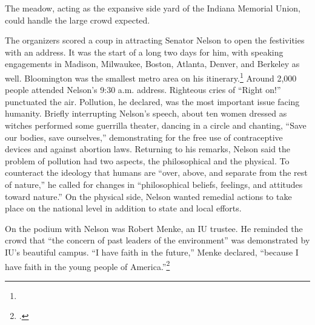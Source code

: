 \documentclass[
  american,
  letterpaper,
]{scrreprt}
\begin{document}
The meadow, acting as the expansive side yard of the Indiana Memorial
Union, could handle the large crowd expected.

The organizers scored a coup in attracting Senator Nelson to open the
festivities with an address. It was the start of a long two days for
him, with speaking engagements in Madison, Milwaukee, Boston, Atlanta,
Denver, and Berkeley as well. Bloomington was the smallest metro area on
his itinerary.\footnote{} Around 2,000 people attended Nelson's 9:30 a.m.
address. Righteous cries of ``Right on!'' punctuated the air. Pollution,
he declared, was the most important issue facing humanity. Briefly
interrupting Nelson's speech, about ten women dressed as witches
performed some guerrilla theater, dancing in a circle and chanting,
``Save our bodies, save ourselves,'' demonstrating for the free use of
contraceptive devices and against abortion laws. Returning to his
remarks, Nelson said the problem of pollution had two aspects, the
philosophical and the physical. To counteract the ideology that humans
are ``over, above, and separate from the rest of nature,'' he called for
changes in ``philosophical beliefs, feelings, and attitudes toward
nature.'' On the physical side, Nelson wanted remedial actions to take
place on the national level in addition to state and local efforts.

On the podium with Nelson was Robert Menke, an IU trustee. He reminded
the crowd that ``the concern of past leaders of the environment'' was
demonstrated by IU's beautiful campus. ``I have faith in the future,''
Menke declared, ``because I have faith in the young people of
America.''\footnote{.}
\end{document}
